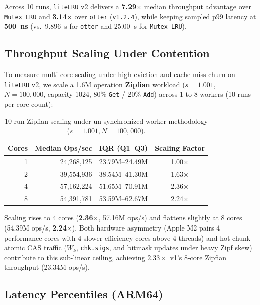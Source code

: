 \documentclass[11pt,a4paper]{article}
\begin{document}
Across 10 runs, \texttt{liteLRU} v2 delivers a \textbf{7.29$\times$} median throughput advantage over \texttt{Mutex LRU} and \textbf{3.14$\times$} over \texttt{otter} (\texttt{v1.2.4}), while keeping sampled p99 latency at \textbf{500~ns} (vs.\ 9.896~\textmu s for \texttt{otter} and 25.00~\textmu s for \texttt{Mutex LRU}).

\subsection{Throughput Scaling Under Contention}

To measure multi-core scaling under high eviction and cache-miss churn on \texttt{liteLRU} v2, we scale a 1.6M operation \textbf{Zipfian} workload ($s=1.001$, $N=100{,}000$, capacity 1024, 80\% \texttt{Get} / 20\% \texttt{Add}) across 1 to 8 workers (10 runs per core count):
\begin{table}[h]
\centering
\begin{tabular}{@{}rrrc@{}}
\toprule
\textbf{Cores} & \textbf{Median Ops/sec} & \textbf{IQR (Q1--Q3)} & \textbf{Scaling Factor} \\ \midrule
1              & 24,268,125              & 23.79M--24.49M        & 1.00$\times$            \\
2              & 39,554,936              & 38.54M--41.30M        & 1.63$\times$            \\
4              & 57,162,224              & 51.65M--70.91M        & 2.36$\times$            \\
8              & 54,391,781              & 53.59M--62.67M        & 2.24$\times$            \\ \bottomrule
\end{tabular}
\caption{10-run Zipfian scaling under un-synchronized worker methodology ($s=1.001, N=100{,}000$).}
\end{table}

Scaling rises to 4 cores (\textbf{2.36$\times$}, 57.16M ops/s) and flattens slightly at 8 cores (54.39M ops/s, \textbf{2.24$\times$}). Both hardware asymmetry (Apple M2 pairs 4 performance cores with 4 slower efficiency cores above 4 threads) and hot-chunk atomic CAS traffic ($W_k$, \texttt{chk.sigs}, and bitmask updates under heavy Zipf skew) contribute to this sub-linear ceiling, achieving $2.33\times$ v1's 8-core Zipfian throughput (23.34M ops/s).

\subsection{Latency Percentiles (ARM64)}
\end{document}
